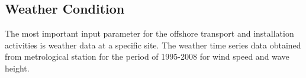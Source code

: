 \subsection{Weather Condition}

The most important input parameter for the offshore transport and installation activities is weather data at a specific site. The weather time series data obtained from metrological station for the period of 1995-2008 for wind speed and wave height. 